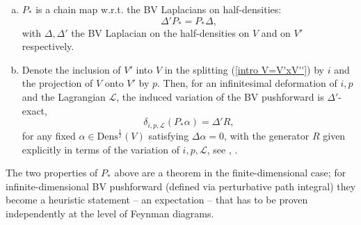 \documentclass[11pt,a4paper]{amsart}
\theoremstyle{plain} %
\theoremstyle{definition}
\theoremstyle{remark}
\newcommand{\mr}{\mathrm}
\newcommand{\ra}{\rightarrow}
\newcommand{\til}{\widetilde}
\newcommand{\mc}{\mathcal}
\begin{document}
 \begin{enumerate}[(a)]
     \item $P_*$ is a chain map w.r.t. the BV Laplacians on half-densities:
     \begin{equation}
     \Delta' P_*= P_* \Delta,
     \end{equation}
     with $\Delta,\Delta'$ the BV Laplacian on the half-densities on $V$ and on $V'$ respectively.
     \item %
     Denote the inclusion of $V'$ into $V$ in the splitting (\ref{intro V=V'xV''}) by $i$ and the projection of $V$ onto $V'$ by $p$. 
     Then, for an infinitesimal deformation 
     of $i,p$ and the Lagrangian $\mc{L}$,
     the induced variation of the BV pushforward is $\Delta'$-exact,
     \begin{equation} \label{intro delta P_*}
    \delta_{i,p,\mc{L}} \left(P_* \alpha\right) = \Delta'R,
     \end{equation}
     for any fixed $\alpha\in \mr{Dens}^{\frac12}(V)$ satisfying $\Delta\alpha=0$, with the generator 
     $R$ given explicitly in terms of the variation of $i,p,\mc{L}$, see \cite{Cattaneo2008}, \cite{Cattaneo2017}.
 \end{enumerate}

The two properties of $P_*$ above are a theorem in the finite-dimensional case; for infinite-dimensional BV pushforward (defined via perturbative path integral) they become a heuristic statement -- an expectation -- that has to be proven independently at the level of Feynman diagrams.
\end{document}
